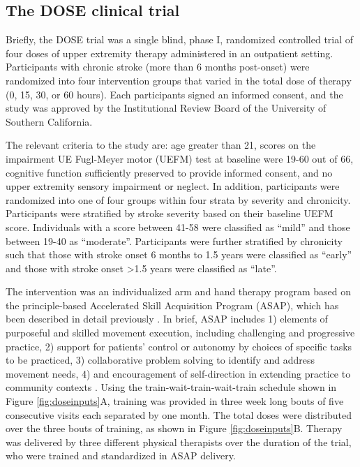 \subsection{The DOSE clinical trial}
Briefly, the DOSE trial was a single blind, phase I, randomized controlled trial of four doses of upper extremity therapy administered in an outpatient setting.  
Participants with chronic stroke (more than 6 months post-onset) were randomized into four intervention groups that varied in the total dose of therapy (0, 15, 30, or 60 hours).  
Each participants signed an informed consent, and the study was approved by the Institutional Review Board of the University of Southern California.

The relevant criteria to the study are: age greater than 21, scores on the impairment UE Fugl-Meyer motor (UEFM) test at baseline were 19-60 out of 66, cognitive function sufficiently preserved to provide informed consent, and no upper extremity sensory impairment or neglect. 
In addition, participants were randomized into one of four groups within four strata by severity and chronicity.  
Participants were stratified by stroke severity based on their baseline UEFM score.  
Individuals with a score between 41-58 were classified as “mild” and those between 19-40 as “moderate”.  
Participants were further stratified by chronicity such that those with stroke onset 6 months to 1.5 years were classified as “early” and those with stroke onset >1.5 years were classified as “late”. 

The intervention was an individualized arm and hand therapy program based on the principle-based Accelerated Skill Acquisition Program (ASAP), which has been described in detail previously \cite{Winstein2014}. 
In brief, ASAP includes 1) elements of purposeful and skilled movement execution, including challenging and progressive practice, 2) support for patients’ control or autonomy by choices of specific tasks to be practiced, 3) collaborative problem solving to identify and address movement needs, 4) and encouragement of self-direction in extending practice to community contexts \cite{Winstein2014}. 
Using the train-wait-train-wait-train schedule shown in Figure \ref{fig:doseinputs}A, training was provided in three week long bouts of five consecutive visits each separated by one month. 
The total doses were distributed over the three bouts of training, as shown in Figure \ref{fig:doseinputs}B. 
Therapy was delivered by three different physical therapists over the duration of the trial, who were trained and standardized in ASAP delivery. 

